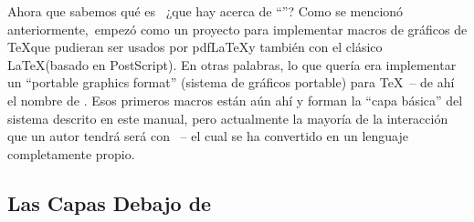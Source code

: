 Ahora que sabemos qué es \tikzname\ ¿que hay acerca de ``\pgfname''? Como se
mencionó anteriormente,\tikzname\ empezó como un proyecto para implementar
macros de gráficos de \TeX que pudieran ser usados por pdf\LaTeX y también con
el clásico \LaTeX (basado en PostScript). En otras palabras, lo que quería era
implementar un ``portable graphics format'' (sistema de gráficos portable) para
\TeX\ -- de ahí el nombre de \pgfname. Esos primeros macros están aún ahí y
forman la ``capa básica'' del sistema descrito en este manual, pero actualmente
la mayoría de la interacción que un autor tendrá será con \tikzname\ -- el cual
se ha convertido en un lenguaje completamente propio.


\subsection{Las Capas Debajo de \tikzname}

